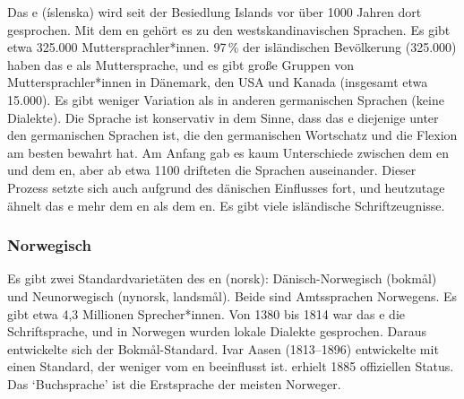 Das e (íslenska) wird seit der Besiedlung Islands vor über 1000 Jahren dort
gesprochen. Mit dem en gehört es zu den westskandinavischen Sprachen.
Es gibt etwa 325.000 Muttersprachler*innen. 97\,\% der isländischen Bevölkerung (325.000) haben das e als
Muttersprache, und es gibt große Gruppen von Muttersprachler*innen in Dänemark, den USA und Kanada
(insgesamt etwa 15.000).
Es gibt weniger Variation als in anderen germanischen Sprachen (keine Dialekte).
Die Sprache ist konservativ in dem Sinne, dass das e
diejenige unter den germanischen Sprachen ist, die den germanischen Wortschatz und die Flexion am besten bewahrt hat.
Am Anfang gab es kaum Unterschiede zwischen dem en und dem en, aber
ab etwa 1100 drifteten die Sprachen auseinander. Dieser Prozess setzte sich auch aufgrund des dänischen
Einflusses fort, und heutzutage ähnelt das e mehr dem en als dem
en. Es gibt viele isländische Schriftzeugnisse.

\subsubsection{Norwegisch}

Es gibt zwei Standardvarietäten des en (norsk): Dänisch-Norwegisch (bokmål) und Neunorwegisch (nynorsk, landsmål).
Beide sind Amtssprachen Norwegens.
Es gibt etwa 4,3 Millionen Sprecher*innen.
Von 1380 bis 1814 war das e die Schriftsprache, und in Norwegen wurden lokale Dialekte gesprochen. Daraus entwickelte sich der Bokmål-Standard.
Ivar Aasen (1813--1896) entwickelte mit  einen Standard, der weniger vom en beeinflusst ist.  erhielt 1885 offiziellen Status. Das  `Buchsprache' ist die Erstsprache der meisten
Norweger.


